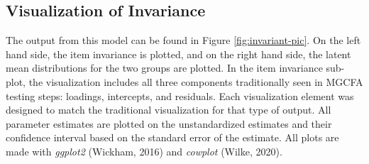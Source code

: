 \documentclass[
  man]{apa7}
\newenvironment{Shaded}{\begin{snugshade}}{\end{snugshade}}
\newcommand{\AttributeTok}[1]{\textcolor[rgb]{0.77,0.63,0.00}{#1}}
\newcommand{\CommentTok}[1]{\textcolor[rgb]{0.56,0.35,0.01}{\textit{#1}}}
\newcommand{\DecValTok}[1]{\textcolor[rgb]{0.00,0.00,0.81}{#1}}
\newcommand{\FunctionTok}[1]{\textcolor[rgb]{0.00,0.00,0.00}{#1}}
\newcommand{\NormalTok}[1]{#1}
\newcommand{\SpecialCharTok}[1]{\textcolor[rgb]{0.00,0.00,0.00}{#1}}
\newcommand{\StringTok}[1]{\textcolor[rgb]{0.31,0.60,0.02}{#1}}
\begin{document}
\small

\begin{Shaded}
\end{Shaded}

\normalsize

\hypertarget{visualization-of-invariance}{%
\subsection{Visualization of Invariance}\label{visualization-of-invariance}}

The output from this model can be found in Figure \ref{fig:invariant-pic}. On the left hand side, the item invariance is plotted, and on the right hand side, the latent mean distributions for the two groups are plotted. In the item invariance sub-plot, the visualization includes all three components traditionally seen in MGCFA testing steps: loadings, intercepts, and residuals. Each visualization element was designed to match the traditional visualization for that type of output. All parameter estimates are plotted on the unstandardized estimates and their confidence interval based on the standard error of the estimate. All plots are made with \emph{ggplot2} (Wickham, 2016) and \emph{cowplot} (Wilke, 2020).
\end{document}
